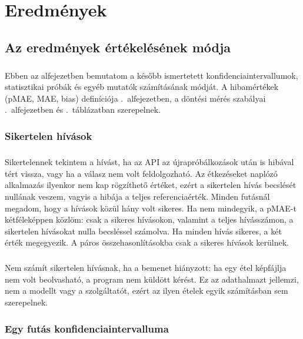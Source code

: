 \chapter{Eredmények}

\section{Az eredmények értékelésének módja}
\label{sec:ertekeles}
\paragraph{}
Ebben az alfejezetben bemutatom a később ismertetett konfidenciaintervallumok, 
statisztikai próbák és egyéb mutatók számításának módját.
A hibamértékek (pMAE, MAE, bias) definíciója \az{\ref{sec:hibamertekek}}.~alfejezetben, a döntési 
mérés szabályai \az{\ref{sec:dontesi_protokoll}}.~alfejezetben és \az{\ref{tab:hipotezisek}}.~táblázatban
szerepelnek.

\subsection{Sikertelen hívások}
\label{sec:sikertelen}
\paragraph{}Sikertelennek tekintem a hívást, ha az API az újrapróbálkozások után is hibával 
tért vissza, vagy ha a válasz nem volt feldolgozható. Az étkezéseket naplózó alkalmazás 
ilyenkor nem kap rögzíthető értéket, ezért a sikertelen hívás becslését nullának veszem, 
vagyis a hibája a teljes referenciaérték. Minden futásnál megadom, hogy a hívások közül 
hány volt sikeres. Ha nem mindegyik, a pMAE-t kétféleképpen közlöm: csak a sikeres 
hívásokon, valamint a teljes hívásszámon, a sikertelen hívásokat nulla becsléssel számolva. 
Ha minden hívás sikeres, a két érték megegyezik. A páros összehasonlításokba csak a 
sikeres hívások kerülnek.

\paragraph{}Nem számít sikertelen hívásnak, ha a bemenet hiányzott: ha egy étel képfájlja 
nem volt beolvasható, a program nem küldött kérést. Ez az adathalmazt jellemzi, nem a 
modellt vagy a szolgáltatót, ezért az ilyen ételek egyik számításban sem szerepelnek.

\subsection{Egy futás konfidenciaintervalluma}
